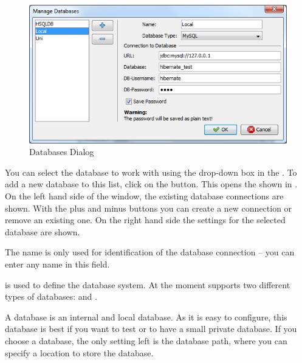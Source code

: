 \begin{figure}[ht]
   \centering
   \includegraphics[scale=0.8]{images/sh_databases_dialog.png}
   \caption{Databases Dialog}
   \label{fig:databases_dialog}
\end{figure}

You can select the database to work with using the drop-down box in the .
To add a new database to this list, click on the  button.
This opens the  shown in .
On the left hand side of the window, the existing database connections are shown.
With the plus and minus buttons you can create a new connection or remove an existing one.
On the right hand side the settings for the selected database are shown.

The name is only used for identification of the database connection -- you can enter any name in this field.

 is used to define the database system. At the moment \sh supports two different types of databases: \hsqldb and \mysql.

A \hsqldb database is an internal and local database.
As it is easy to configure, this database is best if you want to test \sh or to have a small private database.
If you choose a \hsqldb database, the only setting left is the database path, where you can specify a location to store the database.

